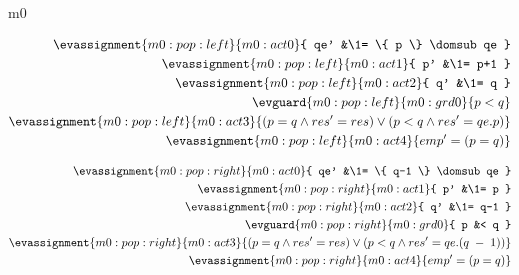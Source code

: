 \documentclass[12pt]{amsart}
\begin{document}
\begin{machine}{m0}

\begin{align*}
\evassignment{m0:pop:left}{m0:act0}{ qe' &\1= \{ p \} \domsub qe }
\\ \evassignment{m0:pop:left}{m0:act1}{ p' &\1= p+1 }
\\ \evassignment{m0:pop:left}{m0:act2}{ q' &\1= q }
\\ \evguard{m0:pop:left}{m0:grd0}{ p < q }
\\ \evassignment{m0:pop:left}{m0:act3}{ (p = q \land res' = res) \lor (p < q \land res' = qe.p) }
\\ \evassignment{m0:pop:left}{m0:act4}{ emp' = (p = q) }
\end{align*}


\begin{align*}
\evassignment{m0:pop:right}{m0:act0}{ qe' &\1= \{ q-1 \} \domsub qe }
\\ \evassignment{m0:pop:right}{m0:act1}{ p' &\1= p }
\\ \evassignment{m0:pop:right}{m0:act2}{ q' &\1= q-1 }
\\ \evguard{m0:pop:right}{m0:grd0}{ p &< q }
\\ \evassignment{m0:pop:right}{m0:act3}{ (p = q \land res' = res) \lor (p < q \land res' = qe.(q\1-1)) }
\\ \evassignment{m0:pop:right}{m0:act4}{ emp' = (p = q) }
\end{align*}

\end{machine}

\newcommand{\REQ}{\text{REQ}}
\end{document}
